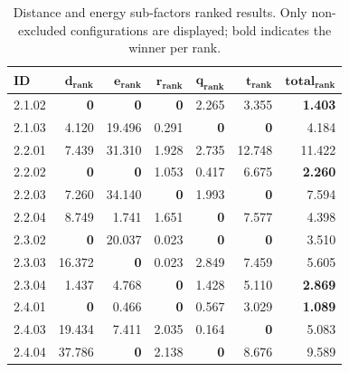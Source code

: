 \begin{table}[!t]
\centering
\footnotesize
\caption{Distance and energy sub-factors ranked results. Only non-excluded configurations are displayed; bold indicates the winner per rank.}
\label{tab:distance_energy_ranked}
\begin{tabular}{@{}lrrrrrr@{}}
\hline
    \textbf{ID} & $\bm{d}_{\textbf{rank}}$ & $\bm{e}_{\textbf{rank}}$ & $\bm{r}_{\textbf{rank}}$ & $\bm{q}_{\textbf{rank}}$ & $\bm{t}_{\textbf{rank}}$ & $\textbf{total}_{\textbf{rank}}$ \\
\hline
    2.1.02 & \textbf{0} & \textbf{0} & \textbf{0} & 2.265 & 3.355 & \textbf{1.403} \\
    2.1.03 & 4.120 & 19.496 & 0.291 & \textbf{0} & \textbf{0} & 4.184 \\
    \noalign{\smallskip}
    2.2.01 & 7.439 & 31.310 & 1.928 & 2.735 & 12.748 & 11.422 \\
    2.2.02 & \textbf{0} & \textbf{0} & 1.053 & 0.417 & 6.675 & \textbf{2.260} \\
    2.2.03 & 7.260 & 34.140 & \textbf{0} & 1.993 & \textbf{0} & 7.594 \\
    2.2.04 & 8.749 & 1.741 & 1.651 & \textbf{0} & 7.577 & 4.398 \\
    \noalign{\smallskip}
    2.3.02 & \textbf{0} & 20.037 & 0.023 & \textbf{0} & \textbf{0} & 3.510 \\
    2.3.03 & 16.372 & \textbf{0} & 0.023 & 2.849 & 7.459 & 5.605 \\
    2.3.04 & 1.437 & 4.768 & \textbf{0} & 1.428 & 5.110 & \textbf{2.869} \\
    \noalign{\smallskip}
    2.4.01 & \textbf{0} & 0.466 & \textbf{0} & 0.567 & 3.029 & \textbf{1.089} \\
    2.4.03 & 19.434 & 7.411 & 2.035 & 0.164 & \textbf{0} & 5.083 \\
    2.4.04 & 37.786 & \textbf{0} & 2.138 & \textbf{0} & 8.676 & 9.589 \\
\hline
\end{tabular}
\end{table}